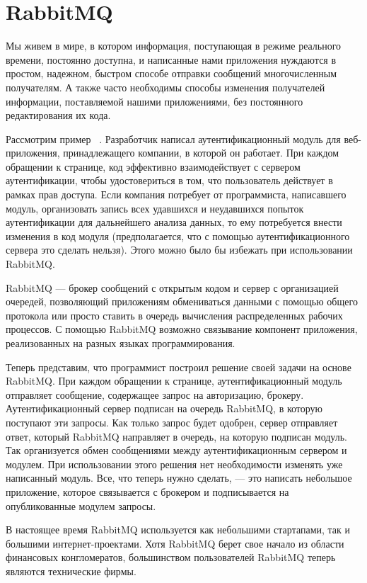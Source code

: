 \chapter{RabbitMQ} 
\label{sec:examples}
Мы живем в мире, в котором информация, поступающая в режиме реального времени, постоянно доступна, и написанные нами приложения нуждаются в простом, надежном, быстром способе отправки сообщений многочисленным получателям. А также часто необходимы способы изменения получателей информации, поставляемой нашими приложениями, без постоянного редактирования их кода.


Рассмотрим пример ~\cite{rabbitmq_in_action}. Разработчик написал аутентификационный модуль для веб-приложения, принадлежащего компании, в которой он работает. При каждом обращении к странице, код эффективно взаимодействует с сервером аутентификации, чтобы удостовериться в том, что пользователь действует в рамках прав доступа. Если компания потребует от программиста, написавшего модуль, организовать запись всех удавшихся и неудавшихся попыток аутентификации для дальнейшего анализа данных, то ему потребуется внести изменения в код модуля (предполагается, что с помощью аутентификационного сервера это сделать нельзя). Этого можно было бы избежать при использовании RabbitMQ.

RabbitMQ --- брокер сообщений с открытым кодом и сервер с организацией очередей, позволяющий приложениям обмениваться данными с помощью общего протокола или просто ставить в очередь вычисления распределенных рабочих процессов. С помощью RabbitMQ возможно связывание компонент приложения, реализованных на разных языках программирования.

Теперь представим, что программист построил решение своей задачи на основе RabbitMQ. При каждом обращении к странице, аутентификационный модуль отправляет сообщение, содержащее запрос на авторизацию, брокеру. Аутентификационный сервер подписан на очередь RabbitMQ, в которую поступают эти запросы. Как только запрос будет одобрен, сервер отправляет ответ, который RabbitMQ направляет в очередь, на которую подписан модуль. Так организуется обмен сообщениями между аутентификационным сервером и модулем. При использовании этого решения нет необходимости изменять уже написанный модуль.  Все, что теперь нужно сделать, --- это написать небольшое приложение, которое связывается с брокером и подписывается на опубликованные модулем запросы.

В настоящее время RabbitMQ используется как небольшими стартапами, так и большими интернет-проектами. Хотя RabbitMQ берет свое начало из области финансовых конгломератов, большинством пользователей RabbitMQ теперь являются технические фирмы.

